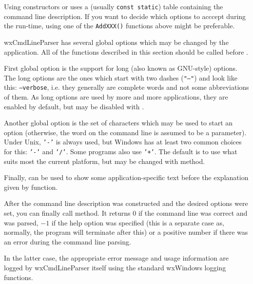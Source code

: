 Using constructors or  uses a (usually 
{\tt const static}) table containing the command line description. If you want
to decide which options to acccept during the run-time, using one of the 
{\tt AddXXX()} functions above might be preferable.

\label{wxcmdlineparsercustomization}

wxCmdLineParser has several global options which may be changed by the
application. All of the functions described in this section should be called
before .

First global option is the support for long (also known as GNU-style) options.
The long options are the ones which start with two dashes ({\tt "--"}) and look
like this: {\tt --verbose}, i.e. they generally are complete words and not some
abbreviations of them. As long options are used by more and more applications,
they are enabled by default, but may be disabled with 
.

Another global option is the set of characters which may be used to start an
option (otherwise, the word on the command line is assumed to be a parameter).
Under Unix, {\tt '-'} is always used, but Windows has at least two common
choices for this: {\tt '-'} and {\tt '/'}. Some programs also use {\tt '+'}.
The default is to use what suits most the current platform, but may be changed
with  method.

Finally,  can be used to show some
application-specific text before the explanation given by 
 function.

\label{wxcmdlineparserparsing}

After the command line description was constructed and the desired options were
set, you can finally call  method.
It returns $0$ if the command line was correct and was parsed, $-1$ if the help
option was specified (this is a separate case as, normally, the program will
terminate after this) or a positive number if there was an error during the
command line parsing.

In the latter case, the appropriate error message and usage information are
logged by wxCmdLineParser itself using the standard wxWindows logging functions.

